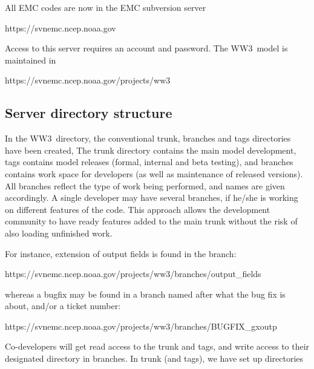 \documentclass[12pt]{article}
\newcommand{\ws}{WW3}
\newcommand{\file}{\sf}
\begin{document}
\vspace{\baselineskip} \noindent
All EMC codes are now in the EMC subversion server

\vspace{\baselineskip}
\centerline{\file https://svnemc.ncep.noaa.gov}
\vspace{\baselineskip}

\noindent
Access to this server requires an account and password. The \ws\ model is
maintained in

\vspace{\baselineskip}
\centerline{\file https://svnemc.ncep.noaa.gov/projects/ww3}
\vspace{\baselineskip}

\subsection{Server directory structure}

\noindent
In the \ws\ directory, the conventional {\file trunk}, {\file branches} and
{\file tags} directories have been created, The {\file trunk} directory
contains the main model development, {\file tags} contains model releases
(formal, internal and beta testing), and {\file branches} contains work space
for developers (as well as maintenance of released versions). All branches reflect
the type of work being performed, and names are given accordingly. A single developer
may have several branches, if he/she is working on different features of the code. This
approach allows the development community to have ready features added to the main trunk
without the risk of also loading unfinished work.

For instance, extension of output fields is found in the branch:

\vspace{\baselineskip}
\centerline{\file https://svnemc.ncep.noaa.gov/projects/ww3/branches/output\_fields}
\vspace{\baselineskip}

whereas a bugfix may be found in a branch named after what the bug fix is about, and/or a
ticket number:

\vspace{\baselineskip}
\centerline{\file https://svnemc.ncep.noaa.gov/projects/ww3/branches/BUGFIX\_gxoutp}
\vspace{\baselineskip}

\noindent
Co-developers will get read access to the {\file trunk} and {\file tags}, and
write access to their designated directory in {\file branches}. In {\file
trunk} (and {\file tags}), we have set up directories
\end{document}
